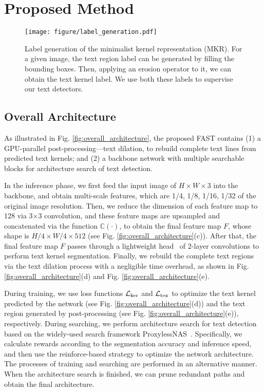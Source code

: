\documentclass[lettersize,journal]{IEEEtran}
\begin{document}
\section{Proposed Method}

\begin{figure}[tbp]
    \centering
    \texttt{[image: figure/label\_generation.pdf]}
    \caption{
    Label generation of the minimalist kernel representation (MKR).
    For a given image, the text region label can be generated by filling the bounding boxes. Then,  applying an erosion operator to it, we can obtain the text kernel label.
    We use both these labels to supervise our text detectors.
    }
    \label{fig:label_generation}
\end{figure}

\subsection{Overall Architecture}

As illustrated in Fig. \ref{fig:overall_architecture}, the proposed FAST contains (1) a GPU-parallel post-processing---text dilation, to rebuild complete text lines from predicted text kernels; and (2) a backbone network with multiple searchable blocks  for architecture search of text detection.


In the inference phase, we first feed the input image of $H\!\times\!W\!\times\!3$ into the backbone, and obtain multi-scale features, which are 1/4, 1/8, 1/16, 1/32 of the original image resolution.
Then, we reduce the dimension of each feature map to 128 via 3$\times$3 convolution, and these feature maps are upsampled and concatenated via the function $\mathbb{C(\cdot)}$, to obtain the final feature map $F$, whose shape is $H/4\!\times\!W/4\!\times\!512$ (see Fig. \ref{fig:overall_architecture}(c)).
After that, the final feature map $F$ passes through a lightweight head~\cite{wang2019efficient} of 2-layer convolutions to perform text kernel segmentation.
Finally, we rebuild the complete text regions via the text dilation process with a negligible time overhead, as shown in Fig. \ref{fig:overall_architecture}(d) and Fig. \ref{fig:overall_architecture}(e).



During training, we use loss functions $\mathcal{L}_{\rm ker}$ and $\mathcal{L}_{\rm tex}$ to optimize the text kernel predicted by the network (see Fig. \ref{fig:overall_architecture}(d)) and the text region generated by post-processing (see Fig. \ref{fig:overall_architecture}(e)), respectively.
During searching, we perform architecture search for text detection based on 
the widely-used search framework ProxylessNAS~\cite{cai2018proxylessnas}.
Specifically, we calculate rewards according to the segmentation accuracy and inference speed, and then use the reinforce-based strategy to optimize the network architecture.
The processes of training and searching are performed in an alternative manner. When the  architecture search is finished, we can prune redundant paths and obtain the final architecture.
\end{document}
